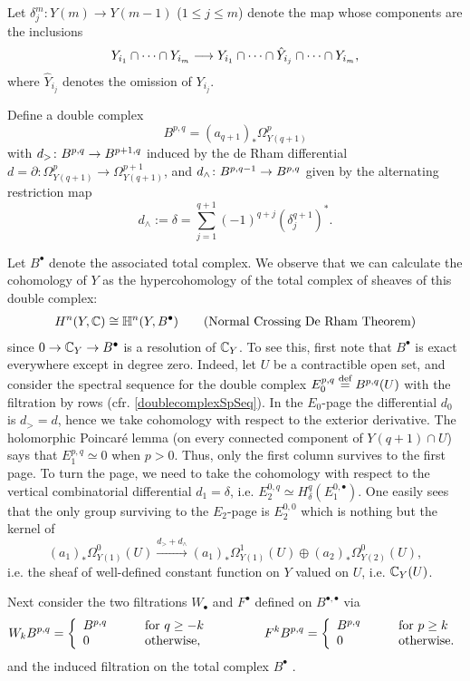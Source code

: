 \documentclass[../main.tex]{subfiles}
\begin{document}
Let $\delta_j^m\colon Y(m) \to Y(m-1)$ ($1 \leq j \leq m$) denote the map whose components are the inclusions
\[Y_{i_1} \cap \cdots \cap Y_{i_{m}} \longrightarrow Y_{i_1} \cap \cdots \cap \hat{Y}_{i_j} \cap \cdots \cap Y_{i_{m}},\]
where $\hat{Y}_{i_j}$ denotes the omission of $Y_{i_j}$.

Define a double complex
\[B^{p,q}= (a_{q+1})_*\Omega^p_{Y(q+1)}\]
with $d_>\colon B^{p,q}\to B^{p+1,q}$ induced by the de Rham differential $d = \partial\colon \Omega_{Y(q+1)}^p \to \Omega_{Y(q+1)}^{p+1}$, and $d_\wedge \colon B^{p,q-1}\to B^{p,q}$ given by the alternating restriction map
\[d_\wedge := \delta=\sum_{j=1}^{q+1} (-1)^{q+j}(\delta_j^{q+1})^*.\] 


Let $B^{\bullet}$ denote the associated total complex.  
We observe that we can calculate the cohomology of $Y$ as the hypercohomology of the total complex of sheaves of this double complex:
\begin{align}
H^n(Y,\mathbb{C}) \cong \mathbb{H}^n(Y,B^{\bullet}) \label{NCDRT}\tag{Normal Crossing De Rham Theorem}
\end{align}
since $0 \to \mathbb{C}_Y \to B^{\bullet}$ is a resolution of $\mathbb{C}_Y$. To see this, first note that $B^{\bullet}$ is exact everywhere except in degree zero. Indeed, let $U$ be a contractible open set, and consider the spectral sequence for the double complex $E_0^{p,q} \stackrel{\text{def}}{=} B^{p,q}(U)$ with the filtration by rows (cfr. \ref{doublecomplexSpSeq}). In the $E_0$-page the differential $d_0$ is $d_>=d$, hence we take cohomology with respect to the exterior derivative. The holomorphic Poincar\'e lemma (on every connected component of $Y(q+1) \cap U$) says that $E^{p,q}_1 \simeq 0$ when $p > 0$. Thus, only the first column survives to the first page. To turn the page, we need to take the cohomology with respect to the vertical combinatorial differential $d_1=\delta$, i.e. $E_2^{0,q} \simeq H_\delta^q(E_1^{0,\bullet})$. One easily sees that the only group surviving to the $E_2$-page is $E_2^{0,0}$ which is nothing but the kernel of 
\[
(a_1)_*\Omega^0_{Y(1)} (U)\xrightarrow{d_>+d_\wedge} (a_1)_*\Omega^1_{Y(1)} (U) \oplus (a_2)_*\Omega^0_{Y(2)}(U),
\]
i.e. the sheaf of well-defined constant function on $Y$ valued on $U$, i.e. $\mathbb{C}_Y (U)$.

Next consider the two filtrations $W_\bullet$ and $F^\bullet$ defined on $B^{\bullet,\bullet}$ via
\[ W_k B^{p,q}=\left\{\begin{array}{lcl} B^{p,q} &\quad&\hbox{for } q\geq -k\\ 0 &&\hbox{otherwise},\end{array}\right.
\qquad\qquad
F^k B^{p,q}=\left\{\begin{array}{lcl} B^{p,q} &\quad&\hbox{for } p\ge k\\ 0 &&\hbox{otherwise}.\end{array}\right.\]
and the induced filtration on the total complex $B^{\bullet}$  .
\end{document}
